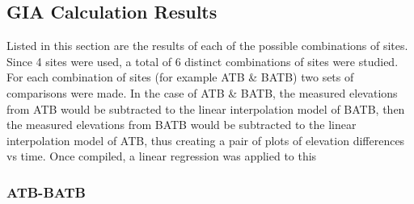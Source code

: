 

\subsection{GIA Calculation Results}



 Listed in this section are the results of each of the possible combinations of sites.
 Since 4 sites were used, a total of 6 distinct combinations of sites were studied.
 For each combination of sites (for example ATB \& BATB) two sets of comparisons
 were made. In the case of ATB \& BATB, the measured elevations from ATB would be
 subtracted to the linear interpolation model of BATB, then the measured elevations
 from BATB would be subtracted to the linear interpolation model of ATB, thus
 creating a pair of plots of elevation differences vs time. Once compiled, a linear
 regression was applied to this 


\subsubsection{ATB-BATB}

